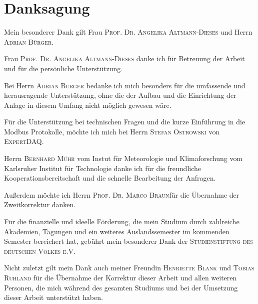 %
%
%
\chapter*{Danksagung}
\thispagestyle{empty}

\noindent Mein besonderer Dank gilt Frau \textsc{Prof. Dr. Angelika Altmann-Dieses} und Herrn \textsc{Adrian Bürger}.

\noindent Frau \textsc{Prof. Dr. Angelika Altmann-Dieses} danke ich für Betreuung der Arbeit und für die persönliche Unterstützung.

\noindent Bei Herrn \textsc{Adrian Bürger} bedanke ich mich besonders für die umfassende und herausragende Unterstützung, ohne die der Aufbau und die Einrichtung der Anlage in diesem Umfang nicht möglich gewesen wäre.

\noindent Für die Unterstützung bei technischen Fragen und die kurze Einführung in die Modbus Protokolle, möchte ich mich bei Herrn \textsc{Stefan Ostrowski} von \textsc{ExpertDAQ}.

\noindent Herrn \textsc{Bernhard Mühr} vom Instut für Meteorologie und Klimaforschung vom Karlsruher Institut für Technologie danke ich für die freundliche Kooperationsbereitschaft und die schnelle Bearbeitung der Anfragen.

\noindent Außerdem möchte ich Herrn \textsc{Prof. Dr. Marco Braun}für die Übernahme der Zweitkorrektur danken.

\noindent Für die finanzielle und ideelle Förderung, die mein Studium durch zahlreiche Akademien, Tagungen und ein weiteres Auslandssemester im kommenden Semester bereichert hat, gebührt mein besonderer Dank der \textsc{Studienstiftung des deutschen Volkes e.V.}

\noindent Nicht zuletzt gilt mein Dank auch meiner Freundin \textsc{Henriette Blank} und \textsc{Tobias Ruhland} für die Übernahme der Korrektur dieser Arbeit und allen weiteren Personen, die mich während des gesamten Studiums und bei der Umsetzung dieser Arbeit unterstützt haben.
